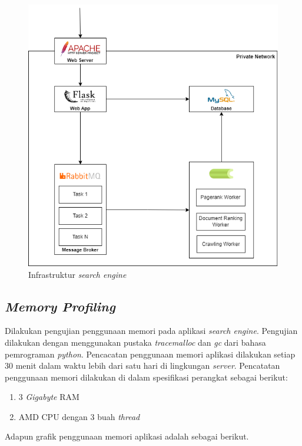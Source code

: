 \documentclass[
	a4paper, %
	10pt, %
	unnumberedsections, %
	twoside, %
]{LTJournalArticle}
\begin{document}
\begin{figure}[H]
	\centering
	\includegraphics[width=\linewidth]{infra2.png}
	\caption{Infrastruktur \textit{search engine}}
\end{figure}

\subsection{\textit{Memory Profiling}}
Dilakukan pengujian penggunaan memori pada aplikasi \textit{search engine}. Pengujian dilakukan dengan menggunakan pustaka \textit{tracemalloc} dan \textit{gc} dari bahasa pemrograman \textit{python}. Pencacatan penggunaan memori aplikasi dilakukan setiap 30 menit dalam waktu lebih dari satu hari di lingkungan \textit{server}. Pencatatan penggunaan memori dilakukan di dalam spesifikasi perangkat sebagai berikut: 

\begin{enumerate}
	\item 3 \textit{Gigabyte} RAM 
	\item AMD CPU dengan 3 buah \textit{thread}
\end{enumerate}

Adapun grafik penggunaan memori aplikasi adalah sebagai berikut.
\end{document}
